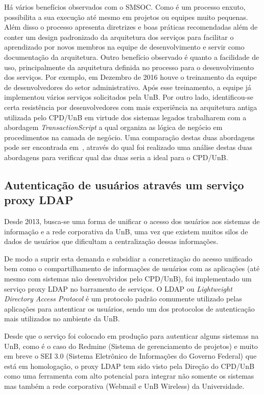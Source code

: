 \documentclass[12pt]{article}
\begin{document}
Há vários benefícios observados com o SMSOC.
Como é um processo enxuto, possibilita
a sua execução até mesmo em projetos ou equipes muito pequenas. Além disso
o processo apresenta diretrizes e boas práticas recomendadas além de conter
um design padronizado 
da arquitetura dos serviços para facilitar o aprendizado por novos membros na equipe
de desenvolvimento e servir como 
documentação da arquitetura. Outro benefício observado é quanto a facilidade 
de uso, principalmente da arquitetura definida no processo para o desenvolvimento dos serviços. 
Por exemplo, em Dezembro de 2016 houve o treinamento
da equipe de desenvolvedores do setor administrativo. Após esse treinamento,
a equipe já implementou vários serviços solicitados pela UnB. 
Por outro lado, identificou-se certa resistência por desenvolvedores com 
mais experiência na arquitetura antiga utilizada pelo CPD/UnB 
em virtude dos sistemas legados trabalharem com 
a abordagem \textit{TransactionScript} 
a qual organiza as lógica de negócio em procedimentos na camada de negócio. 
Uma comparação
destas duas abordagens pode ser encontrada em~\cite{agilar2016},
através do qual foi realizado uma análise destas duas abordagens
para verificar qual das duas seria a ideal para o CPD/UnB.




\subsection{Autenticação de usuários através um serviço proxy LDAP}\label{ldap}

Desde 2013, busca-se uma forma de unificar o acesso dos usuários aos
sistemas de informação e a rede corporativa da UnB, 
uma vez que existem muitos
silos de dados de usuários que dificultam a centralização dessas informações. 

De modo a suprir esta demanda e subsidiar a concretização do acesso 
unificado bem como o compartilhamento de informações de usuários
com as aplicações (até mesmo com sistemas não desenvolvidos pelo CPD/UnB), 
foi implementado um serviço proxy LDAP no barramento de serviços.
O LDAP ou \textit{Lightweight Directory Access Protocol} é um 
protocolo padrão comumente utilizado pelas aplicações para autenticar os usuários,
sendo um dos protocolos de autenticação mais utilizados no ambiente da UnB.

Desde que o serviço foi colocado em produção para 
autenticar alguns sistemas na UnB, como é o caso do Redmine (Sistema de gerenciamento de projetos) e 
muito em breve o SEI 3.0 (Sistema Eletrônico de Informações do Governo Federal) que está em homologação,
o proxy LDAP tem sido visto pela Direção do CPD/UnB como uma ferramenta
com alto potencial para integrar não somente os sistemas 
mas também a rede corporativa (Webmail e UnB Wireless) da Universidade.
\end{document}
